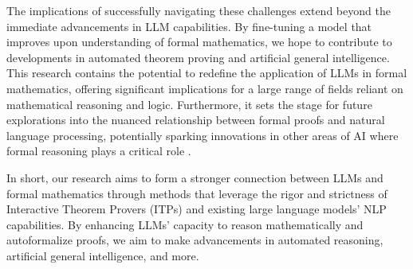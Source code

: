 The implications of successfully navigating these challenges extend beyond the immediate advancements in LLM capabilities. By fine-tuning a model that improves upon understanding of formal mathematics, we hope to contribute to developments in automated theorem proving and artificial general intelligence. This research contains the potential to redefine the application of LLMs in formal mathematics, offering significant implications for a large range of fields reliant on mathematical reasoning and logic. Furthermore, it sets the stage for future explorations into the nuanced relationship between formal proofs and natural language processing, potentially sparking innovations in other areas of AI where formal reasoning plays a critical role \cite{wu2022autoformalization_arxiv} \cite{zheng2022minif2f}.

In short, our research aims to form a stronger connection between LLMs and formal mathematics through methods that leverage the rigor and strictness of Interactive Theorem Provers (ITPs) and existing large language models' NLP capabilities. By enhancing LLMs' capacity to reason mathematically and autoformalize proofs, we aim to make advancements in automated reasoning, artificial general intelligence, and more.
